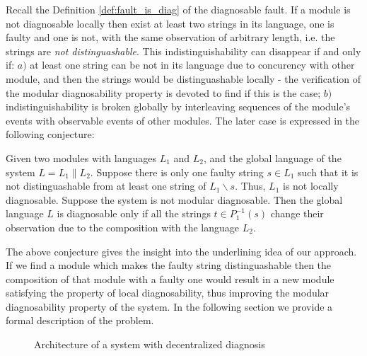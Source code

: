 \documentclass[a4paper, 10pt, conference]{ieeeconf}
\begin{document}
Recall the Definition \ref{def:fault_is_diag} of the diagnosable fault. If a
module is not diagnosable locally then exist at least two strings in its
language, one is faulty and one is not, with the same observation of arbitrary
length, i.e. the strings are \emph{not distinguashable}. This
indistinguishability can disappear if and only if:
$a)$ at least one string can be not in its language due to concurency with other
module, and then the strings would be distinguashable locally - the verification
of the modular diagnosability property is devoted to find if this is the case;
$b)$ indistinguishability is broken globally by interleaving sequences of the
module's events with observable events of other modules. The later case is
expressed in the following conjecture:
\begin{conjecture} Given two modules with languages $L_1$ and $L_2$, and the
global language of the system $L = L_1 \parallel L_2$. Suppose there is only one
faulty string $s \in L_1$ such that it is not distinguashable from at least one
string of $L_1\backslash s$. Thus, $L_1$ is not locally diagnosable. Suppose the
system is not modular diagnosable. Then the global language $L$ is diagnosable
only if all the strings $t \in P_1^{-1}(s)$ change their observation due to 
the composition with the language $L_2$.
\end{conjecture}

The above conjecture gives the insight into the underlining idea of our
approach. If we find a module which makes the faulty string distinguashable
then the composition of that module with a faulty one would result in a new
module satisfying the property of local diagnosability, thus improving
the modular diagnosability property of the system. In the following section we
provide a formal description of the problem.




\begin{figure}[t]
\centering
{}
\caption{Architecture of a system with decentralized diagnosis}
\label{fig_decentralized}
\end{figure}
\end{document}

